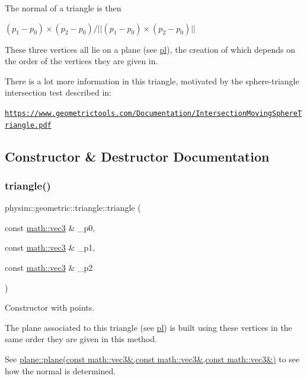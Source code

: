 The normal of a triangle is then

$ (p_1 - p_0) \times (p_2 - p_0) / || (p_1 - p_0) \times (p_2 - p_0) || $

These three vertices all lie on a plane (see \hyperlink{classphysim_1_1geometric_1_1triangle_af56be3b510d3a9996fbeab59ec26f584}{pl}), the creation of which depends on the order of the vertices they are given in.

There is a lot more information in this triangle, motivated by the sphere-\/triangle intersection test described in\+:

\href{https://www.geometrictools.com/Documentation/IntersectionMovingSphereTriangle.pdf}{\tt https\+://www.\+geometrictools.\+com/\+Documentation/\+Intersection\+Moving\+Sphere\+Triangle.\+pdf} 

\subsection{Constructor \& Destructor Documentation}
\mbox{\label{classphysim_1_1geometric_1_1triangle_a2d57f5d97789fbe518c896983de18822}} 
\subsubsection{\texorpdfstring{triangle()}{triangle()}}
{\footnotesize\ttfamily physim\+::geometric\+::triangle\+::triangle (\begin{DoxyParamCaption}\item[{const \hyperlink{structphysim_1_1math_1_1vec3}{math\+::vec3} \&}]{\+\_\+p0,  }\item[{const \hyperlink{structphysim_1_1math_1_1vec3}{math\+::vec3} \&}]{\+\_\+p1,  }\item[{const \hyperlink{structphysim_1_1math_1_1vec3}{math\+::vec3} \&}]{\+\_\+p2 }\end{DoxyParamCaption})}



Constructor with points. 

The plane associated to this triangle (see \hyperlink{classphysim_1_1geometric_1_1triangle_af56be3b510d3a9996fbeab59ec26f584}{pl}) is built using these vertices in the same order they are given in this method.

See \hyperlink{classphysim_1_1geometric_1_1plane_a5d793dd111e0b7c83c7e11b47c037637}{plane\+::plane(const math\+::vec3\&,const math\+::vec3\&,const math\+::vec3\&)} to see how the normal is determined. 

